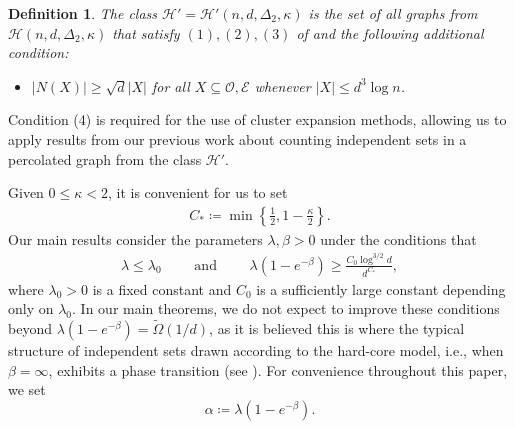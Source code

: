 \documentclass[reqno,a4paper,11pt]{amsart}
\newtheorem{definition}[theorem]{Definition}
\newcommand{\cE}{\mathcal{E}}
\newcommand{\cH}{\mathcal{H}}
\newcommand{\cO}{\mathcal{O}}
\newcommand{\lam}{\lambda}
\newcommand{\ex}{\kappa}
\newcommand{\exx}{C_*}
\newcommand{\codeg}{\Delta_2}
\begin{document}
\begin{definition}\cite[Definition 11.1]{GeKaSaWdo25}\label{def:H'}
The class $\cH'=\cH'(n,d,\codeg,\ex)$ is the set of all graphs from $\cH(n, d, \codeg, \ex)$ that satisfy $(1), (2), (3)$ of  and the following additional condition:
    \begin{itemize}
        \item[(4)] $|N(X)| \geq \sqrt{d} |X|$ for all $X \subseteq \cO, \cE$ whenever $|X| \leq d^3 \log n$.
    \end{itemize}  
\end{definition}

Condition (4) is required for the use of cluster expansion methods, allowing us to apply results from our previous work \cite{GeKaSaWdo25} about counting independent sets in a percolated graph from the class $\cH'$.

Given $0 \le \ex < 2$, it is convenient for us to set
\begin{align*}
    \exx \coloneqq \min\left\{\frac{1}{2}, 1-\frac{\ex}{2}\right\}.
\end{align*}
Our main results consider the parameters $\lam, \beta > 0$ under the conditions that
\begin{align} \label{eq:cond_lam_beta}
    \lambda \leq \lam_0 \qquad \text{ and } \qquad  \lam(1 - e^{-\beta}) \geq \frac{C_0 \log^{3/2} d}{d^{\exx}},
\end{align}
where $\lambda_0 > 0$ is a fixed constant and $C_0$ is a sufficiently large constant depending only on $\lambda_0$. In our main theorems, we do not expect to improve these conditions beyond $\lam (1 - e^{-\beta}) = \tilde{\Omega}(1/d)$, as it is believed this is where the typical structure of independent sets drawn according to the hard-core model, i.e., when $\beta=\infty$, exhibits a phase transition (see \cite{galvin2011threshold, jenssen2024refined}). For convenience throughout this paper, we set
$$\alpha \coloneqq \lambda (1 - e^{-\beta}).$$
\end{document}
